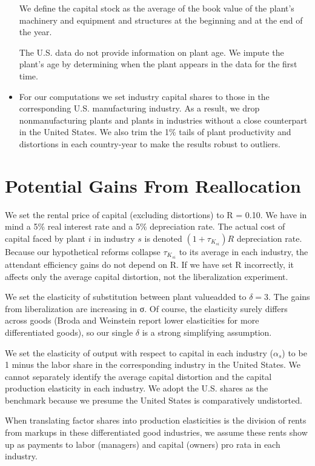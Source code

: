 \documentclass{article}
\begin{document}
\begin{itemize}
    We define the capital stock as the average of the book value of the plant’s machinery and equipment and structures at the beginning and at the end of the year. 

    The U.S. data do not provide information on plant age. We impute the plant’s age by determining when the plant appears in the data for the first time.
    \item For our computations we set industry capital shares to those in the corresponding U.S. manufacturing industry. As a result, we drop nonmanufacturing plants and plants in industries without a close counterpart in the United States. We also trim the 1\% tails of plant productivity and distortions in each country-year to make the results robust to outliers. 
    \end{itemize}

\section*{Potential Gains From Reallocation}
We set the rental price of capital (excluding distortions) to R = 0.10. We have in mind a 5\% real interest rate and a 5\% depreciation rate. The actual cost of capital faced by plant $i$ in industry $s$ is denoted $(1 + \tau_{K_{si}})R$ depreciation rate. Because our hypothetical reforms collapse $\tau_{K_{si}}$ to its average in each industry, the attendant efficiency gains do not depend on R. If we have set R incorrectly, it affects only the average capital distortion, not the liberalization experiment.

We set the elasticity of substitution between plant valueadded to $\delta = 3$. The gains from liberalization are increasing in σ. Of course, the elasticity surely differs across goods (Broda and Weinstein report lower elasticities for more differentiated goods), so our single $\delta$ is a strong simplifying assumption.

We set the elasticity of output with respect to capital in each industry ($\alpha_s$) to be 1 minus the labor share in the corresponding industry in the United States. We cannot separately identify the average capital distortion and the capital production elasticity in each industry. We adopt the U.S. shares as the benchmark because we presume the United States is comparatively undistorted.

When translating factor shares into production elasticities is the division of rents from markups in these differentiated good industries, we assume these rents show up as payments to labor (managers) and capital (owners) pro rata in each industry. 
\end{document}
